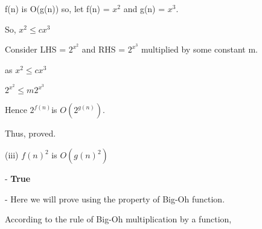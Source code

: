 \documentclass[letterpaper,portrait,12pt]{article}
\begin{document}
\begin{flushleft}
f(n) is O(g(n)) so, let f(n) = $x^2$ and g(n) = $x^3$.
\end{flushleft}


\begin{flushleft}

\end{flushleft}


\begin{flushleft}
So, $x^2 \le c  x^3$ 
\end{flushleft}


\begin{flushleft}

\end{flushleft}


\begin{flushleft}
Consider LHS = $2^{x^2}$ and RHS = $2^{x^{3}} $ multiplied by some constant m.
\end{flushleft}


\begin{flushleft}

\end{flushleft}


\begin{flushleft}
as $x^2 \le c  x^3$
\end{flushleft}


\begin{flushleft}
$2^{x^{2}} \le  m2^{x^{3}} $
\end{flushleft}


\begin{flushleft}
Hence  $2^{f(n)}$is $O(2^{g(n)})$. 
\end{flushleft}


\begin{flushleft}
Thus, proved.
\end{flushleft}


\begin{flushleft}
(iii) ${f(n)}^2$ is $O({g(n)}^2)$
\end{flushleft}


\begin{flushleft}
- \textbf{True}
\end{flushleft}


\begin{flushleft}
- Here we will prove using the property of Big-Oh function.
\end{flushleft}


\begin{flushleft}
According to the rule of Big-Oh multiplication by a function,
\end{flushleft}
\end{document}
